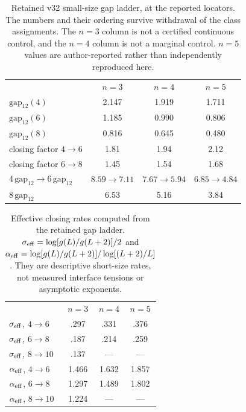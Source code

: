 \begin{table}[t]
\caption{Retained v32 small-size gap ladder, at the reported locators. The numbers and their ordering survive withdrawal of the class assignments. The $n=3$ column is not a certified continuous control, and the $n=4$ column is not a marginal control. $n=5$ values are author-reported rather than independently reproduced here.}
\label{tab:n5twosize}
\begin{ruledtabular}
\begin{tabular}{lccc}
 & $n=3$ & $n=4$ & $n=5$\\
\colrule
$\mathrm{gap}_{12}(4)$ & 2.147 & 1.919 & 1.711\\
$\mathrm{gap}_{12}(6)$ & 1.185 & 0.990 & 0.806\\
$\mathrm{gap}_{12}(8)$ & 0.816 & 0.645 & 0.480\\
closing factor $4\to6$ & 1.81 & 1.94 & 2.12\\
closing factor $6\to8$ & 1.45 & 1.54 & 1.68\\
$4\,\mathrm{gap}_{12}\to6\,\mathrm{gap}_{12}$ & $8.59\to7.11$ & $7.67\to5.94$ & $6.85\to4.84$\\
$8\,\mathrm{gap}_{12}$ & 6.53 & 5.16 & 3.84\\
\end{tabular}
\end{ruledtabular}
\end{table}

\begin{table}[t]
\caption{Effective closing rates computed from the retained gap ladder. $\sigma_{\rm eff}=\log[g(L)/g(L+2)]/2$ and $\alpha_{\rm eff}=\log[g(L)/g(L+2)]/\log[(L+2)/L]$. They are descriptive short-size rates, not measured interface tensions or asymptotic exponents.}
\label{tab:closingrates}
\begin{ruledtabular}
\begin{tabular}{lccc}
 & $n=3$ & $n=4$ & $n=5$\\
\colrule
$\sigma_{\rm eff}$, $4\to6$ & .297 & .331 & .376\\
$\sigma_{\rm eff}$, $6\to8$ & .187 & .214 & .259\\
$\sigma_{\rm eff}$, $8\to10$ & .137 & --- & ---\\
$\alpha_{\rm eff}$, $4\to6$ & 1.466 & 1.632 & 1.857\\
$\alpha_{\rm eff}$, $6\to8$ & 1.297 & 1.489 & 1.802\\
$\alpha_{\rm eff}$, $8\to10$ & 1.224 & --- & ---\\
\end{tabular}
\end{ruledtabular}
\end{table}

